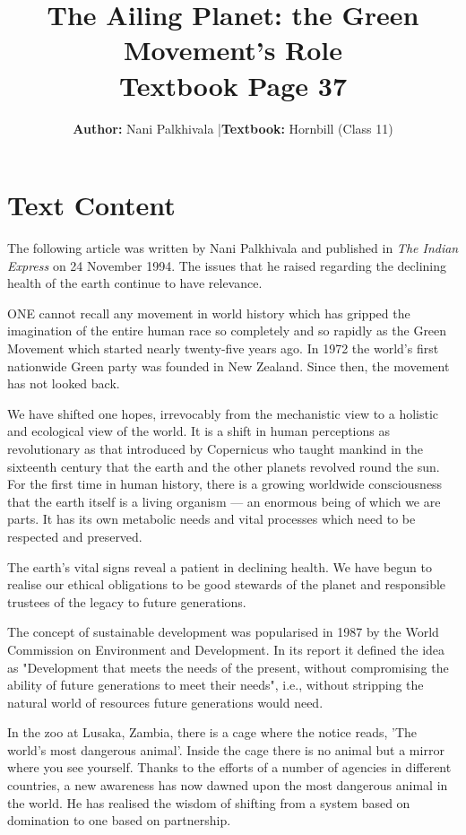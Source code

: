 \documentclass[12pt,a4paper]{article}
\title{\textbf{The Ailing Planet: the Green Movement's Role}\\[0.3em] \Large Textbook Page 37}
\author{\textbf{Author:} Nani Palkhivala \quad|\quad \textbf{Textbook:} Hornbill (Class 11)}
\date{}
\begin{document}
\maketitle

\section*{Text Content}

The following article was written by Nani Palkhivala and published in \textit{The Indian Express} on 24 November 1994. The issues that he raised regarding the declining health of the earth continue to have relevance.

ONE cannot recall any movement in world history which has gripped the imagination of the entire human race so completely and so rapidly as the Green Movement which started nearly twenty-five years ago. In 1972 the world's first nationwide Green party was founded in New Zealand. Since then, the movement has not looked back.

We have shifted one hopes, irrevocably from the mechanistic view to a holistic and ecological view of the world. It is a shift in human perceptions as revolutionary as that introduced by Copernicus who taught mankind in the sixteenth century that the earth and the other planets revolved round the sun. For the first time in human history, there is a growing worldwide consciousness that the earth itself is a living organism — an enormous being of which we are parts. It has its own metabolic needs and vital processes which need to be respected and preserved.

The earth's vital signs reveal a patient in declining health. We have begun to realise our ethical obligations to be good stewards of the planet and responsible trustees of the legacy to future generations.

The concept of sustainable development was popularised in 1987 by the World Commission on Environment and Development. In its report it defined the idea as "Development that meets the needs of the present, without compromising the ability of future generations to meet their needs", i.e., without stripping the natural world of resources future generations would need.

In the zoo at Lusaka, Zambia, there is a cage where the notice reads, 'The world's most dangerous animal'. Inside the cage there is no animal but a mirror where you see yourself. Thanks to the efforts of a number of agencies in different countries, a new awareness has now dawned upon the most dangerous animal in the world. He has realised the wisdom of shifting from a system based on domination to one based on partnership.
\end{document}
